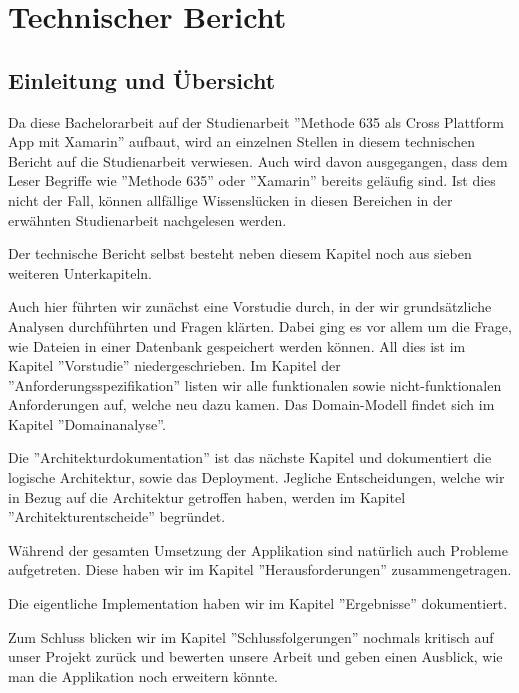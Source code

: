 \section{Technischer Bericht}

\subsection{Einleitung und Übersicht}
Da diese Bachelorarbeit auf der Studienarbeit ''Methode 635 als Cross Plattform App mit Xamarin'' \cite{methode635-sa} aufbaut, wird an einzelnen Stellen in diesem technischen Bericht auf die Studienarbeit verwiesen. Auch wird davon ausgegangen, dass dem Leser Begriffe wie ''Methode 635'' oder ''Xamarin'' bereits geläufig sind. Ist dies nicht der Fall, können allfällige Wissenslücken in diesen Bereichen in der erwähnten Studienarbeit nachgelesen werden.

Der technische Bericht selbst besteht neben diesem Kapitel noch aus sieben weiteren Unterkapiteln. 

Auch hier führten wir zunächst eine Vorstudie durch, in der wir grundsätzliche Analysen durchführten und Fragen klärten. Dabei ging es vor allem um die Frage, wie Dateien in einer Datenbank gespeichert werden können. All dies ist im Kapitel ''Vorstudie'' niedergeschrieben.
Im Kapitel der ''Anforderungsspezifikation'' listen wir alle funktionalen sowie nicht-funktionalen Anforderungen auf, welche neu dazu kamen. Das Domain-Modell findet sich im Kapitel ''Domainanalyse''.

Die ''Architektur\-dokumentation'' ist das nächste Kapitel und dokumentiert die logische Architektur, sowie das Deployment. Jegliche Entscheidungen, welche wir in Bezug auf die Architektur getroffen haben, werden im Kapitel ''Architekturentscheide'' begründet.

Während der gesamten Umsetzung der Applikation sind natürlich auch Probleme aufgetreten. Diese haben wir im Kapitel ''Herausforderungen'' zusammengetragen.

Die eigentliche Implementation haben wir im Kapitel ''Ergebnisse'' dokumentiert.

Zum Schluss blicken wir im Kapitel ''Schlussfolgerungen'' nochmals kritisch auf unser Projekt zurück und bewerten unsere Arbeit und geben einen Ausblick, wie man die Applikation noch erweitern könnte.





\newpage


\newpage


\newpage


\newpage


\newpage


\newpage


\newpage


\newpage

